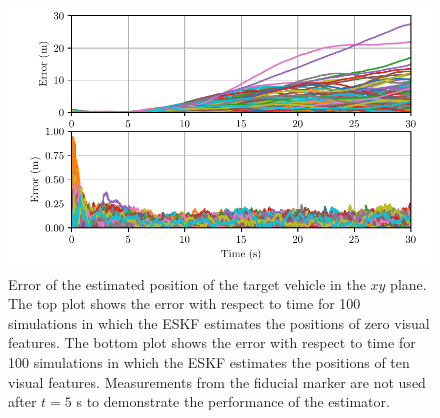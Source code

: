\begin{figure}
  \centering
  \includegraphics[width=5.5in]{plots/mc_both_xy_err}
  \caption[Estimation Error for 100 Simulations]{Error of the estimated position of the target vehicle in the $xy$
    plane. The top plot shows the error with respect to time for 100 simulations in which the ESKF
    estimates the positions of zero visual features. The bottom plot shows the
    error with respect to time for 100 simulations in which the ESKF estimates
    the positions of ten
    visual features.
    Measurements from the fiducial marker are not used after $t = 5$ s to
    demonstrate the performance of the estimator.
}
  \label{fig:mc_xy_err}
\end{figure}

